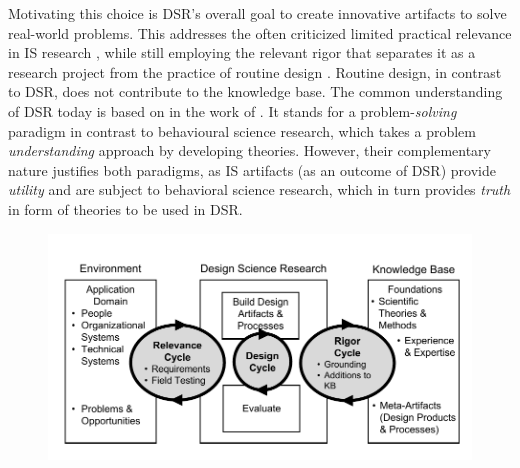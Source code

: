 Motivating this choice is \acrshort{DSR}'s overall goal to create innovative artifacts to solve real-world problems. This addresses the often criticized limited practical relevance in \acrshort{IS} research \citep{hirschheim}, while still employing the relevant rigor that separates it as a research project from the practice of routine design \citep{Winter2008Hevner}. Routine design, in contrast to \acrshort{DSR}, does not contribute to the knowledge base. The common understanding of \acrshort{DSR} today is based on in the work of \cite{Hevner2004}. It stands for a problem-\textit{solving} paradigm in contrast to behavioural science research, which takes a problem \textit{understanding} approach by developing theories. However, their complementary nature justifies both paradigms, as IS artifacts (as an outcome of \acrshort{DSR}) provide \textit{utility} and are subject to behavioral science research, which in turn provides \textit{truth} in form of theories to be used in \acrshort{DSR}.

			
\begin{figure}[caption={Design Science Research Cycles}, label={fig:dsr}]
	{	\includegraphics[width=.8\textwidth]{figures/dsr.pdf}
	} \\
\parbox{0.8\textwidth}{}
\end{figure}


